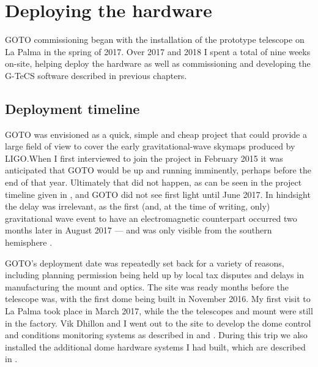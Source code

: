 \section{Deploying the hardware}
\label{sec:hardware_commissioning}
\begin{colsection}


\begin{colsection}

GOTO commissioning began with the installation of the prototype telescope on La Palma in the spring of 2017. Over 2017 and 2018 I spent a total of nine weeks on-site, helping deploy the hardware as well as commissioning and developing the G-TeCS software described in previous chapters.

\end{colsection}


\subsection{Deployment timeline}
\label{sec:timeline}
\begin{colsection}

GOTO was envisioned as a quick, simple and cheap project that could provide a large field of view to cover the early gravitational-wave skymaps produced by LIGO.\@ When I first interviewed to join the project in February 2015 it was anticipated that GOTO would be up and running imminently, perhaps before the end of that year. Ultimately that did not happen, as can be seen in the project timeline given in , and GOTO did not see first light until June 2017. In hindsight the delay was irrelevant, as the first (and, at the time of writing, only) gravitational wave event to have an electromagnetic counterpart occurred two months later in August 2017 --- and was only visible from the southern hemisphere \citep{GW170817,GW170817_followup}.

GOTO's deployment date was repeatedly set back for a variety of reasons, including planning permission being held up by local tax disputes and delays in manufacturing the mount and optics. The site was ready months before the telescope was, with the first dome being built in November 2016. My first visit to La Palma took place in March 2017, while the the telescopes and mount were still in the factory. Vik Dhillon and I went out to the site to develop the dome control and conditions monitoring systems as described in  and . During this trip we also installed the additional dome hardware systems I had built, which are described in .


\end{colsection}
\end{colsection}
